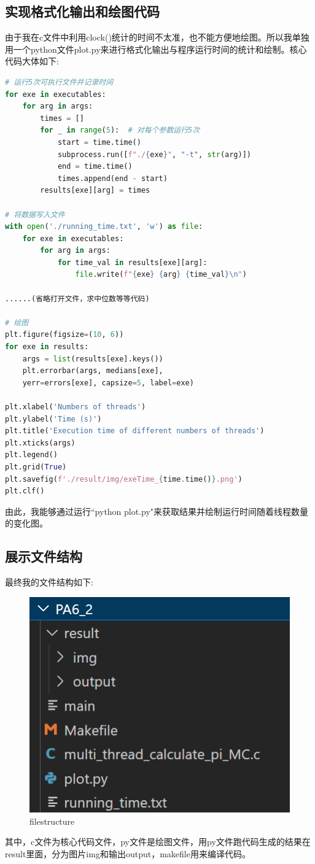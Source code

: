 \documentclass{LabReport}
\begin{document}
	\subsection{实现格式化输出和绘图代码}
	由于我在c文件中利用clock()统计的时间不太准，也不能方便地绘图。所以我单独用一个python文件plot.py来进行格式化输出与程序运行时间的统计和绘制。核心代码大体如下:
		\begin{lstlisting}[language=python,frame=shadowbox]
# 运行5次可执行文件并记录时间
for exe in executables:
	for arg in args:
		times = []
		for _ in range(5):  # 对每个参数运行5次
			start = time.time()
			subprocess.run([f"./{exe}", "-t", str(arg)])
			end = time.time()
			times.append(end - start)
		results[exe][arg] = times

# 将数据写入文件
with open('./running_time.txt', 'w') as file:
	for exe in executables:
		for arg in args:
			for time_val in results[exe][arg]:
				file.write(f"{exe} {arg} {time_val}\n")
				
......(省略打开文件，求中位数等等代码)

# 绘图
plt.figure(figsize=(10, 6))
for exe in results:
	args = list(results[exe].keys())
	plt.errorbar(args, medians[exe], 
	yerr=errors[exe], capsize=5, label=exe)

plt.xlabel('Numbers of threads')
plt.ylabel('Time (s)')
plt.title('Execution time of different numbers of threads')
plt.xticks(args)
plt.legend()
plt.grid(True)
plt.savefig(f'./result/img/exeTime_{time.time()}.png')
plt.clf()
	\end{lstlisting}
	由此，我能够通过运行``python plot.py"来获取结果并绘制运行时间随着线程数量的变化图。
	
	\subsection{展示文件结构}
	最终我的文件结构如下:
	
\begin{figure}[h!]
	\centering
	\includegraphics[width=0.7\linewidth]{figures/file_structure}
	\caption{filestructure}
	\label{fig:filestructure}
\end{figure}
	其中，c文件为核心代码文件，py文件是绘图文件，用py文件跑代码生成的结果在result里面，分为图片img和输出output，makefile用来编译代码。
\end{document}

